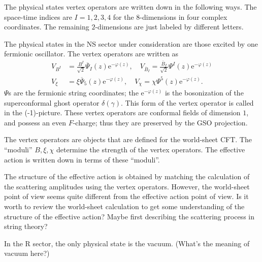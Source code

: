 The physical states vertex operators are written down in the following ways.
The space-time indices are $I = 1,2,3,4$
for the $8$-dimensions in four complex coordinates.
The remaining $2$-dimensions are just labeled by different letters.

The physical states in the NS sector under consideration
are those excited by one fermionic oscillator.
The vertex operators are written as
\begin{align*}
	V_{B^I} &= \frac{B^I}{\sqrt{2}} \overline{\Psi}_I (z) \mathrm{e}^{-\varphi(z)},\quad
	V_{\overline{B}_I} = \frac{\overline{B}_I}{\sqrt{2}} \Psi^I (z) \mathrm{e}^{-\varphi(z)} 
	\\
	V_{\xi} &= \xi \overline{\Psi}_5 (z) \mathrm{e}^{-\varphi(z)},\quad
	V_{\chi} = \chi \Psi^5 (z) \mathrm{e}^{-\varphi(z)}.
\end{align*}
$\Psi$s are the fermionic string coordinates; 
the $\mathrm{e}^{-\varphi(z)}$ is the bosonization of the superconformal ghost operator $\delta(\gamma)$.
This form of the vertex operator is called in the (-1)-picture.
These vertex operators are conformal fields of dimension $1$,
and possess an even $F$-charge;
thus they are preserved by the GSO projection.
\begin{problem}
The vertex operators are objects that are defined for the world-sheet CFT.
The ``moduli'' $B,\xi,\chi$ determine the strength of the vertex operators.
The effective action is written down in terms of these ``moduli''.

The structure of the effective action is obtained by 
matching the calculation of the scattering amplitudes using the vertex operators.
However, the world-sheet point of view seems quite different from the effective action point of view.
Is it worth to review the world-sheet calculation to get some understanding of the structure of the effective action?
Maybe first describing the scattering process in string theory?
\end{problem}

In the R sector, the only physical state is the vacuum.
(What's the meaning of vacuum here?)
